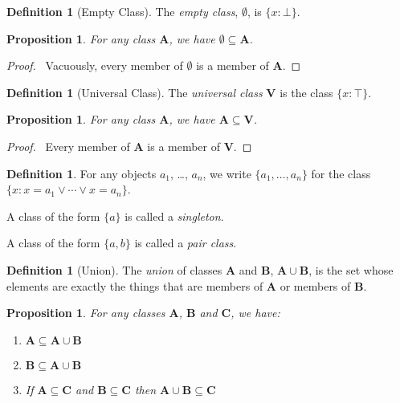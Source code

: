 \documentclass{article}
\let\qed\relax
\newtheorem{proposition}[axiom]{Proposition}
\theoremstyle{definition}
\newtheorem{definition}[axiom]{Definition}
\begin{document}
    \begin{definition}[Empty Class]
        The \emph{empty class}, $\emptyset$, is $\{ x : \bot \}$.
    \end{definition}

    \begin{proposition}
        For any class $\mathbf{A}$, we have $\emptyset \subseteq \mathbf{A}$.
    \end{proposition}

    \begin{proof}
        \pf\ Vacuously, every member of $\emptyset$ is a member of $\mathbf{A}$.
    \end{proof}

    \begin{definition}[Universal Class]
        The \emph{universal class} $\mathbf{V}$ is the class $\{ x : \top \}$.
    \end{definition}

    \begin{proposition}
        For any class $\mathbf{A}$, we have $\mathbf{A} \subseteq \mathbf{V}$.
    \end{proposition}

    \begin{proof}
        \pf\ Every member of $\mathbf{A}$ is a member of $\mathbf{V}$. \qed
    \end{proof}

    \begin{definition}
        For any objects $a_1$, \ldots, $a_n$, we write $\{ a_1, \ldots, a_n \}$ for the class
        $\{ x : x = a_1 \vee \cdots \vee x = a_n \}$.

        A class of the form $\{a\}$ is called a \emph{singleton}.

        A class of the form $\{a,b\}$ is called a \emph{pair class}.
    \end{definition}

    \begin{definition}[Union]
        The \emph{union} of classes $\mathbf{A}$ and $\mathbf{B}$, 
        $\mathbf{A} \cup \mathbf{B}$, is the set whose elements are exactly the things
        that are members of $\mathbf{A}$ or members of $\mathbf{B}$.
    \end{definition}

    \begin{proposition}
        For any classes $\mathbf{A}$, $\mathbf{B}$ and $\mathbf{C}$, we have:
        \begin{enumerate}
            \item $\mathbf{A} \subseteq \mathbf{A} \cup \mathbf{B}$
            \item $\mathbf{B} \subseteq \mathbf{A} \cup \mathbf{B}$
            \item If $\mathbf{A} \subseteq \mathbf{C}$ and $\mathbf{B} \subseteq \mathbf{C}$
            then $\mathbf{A} \cup \mathbf{B} \subseteq \mathbf{C}$
        \end{enumerate}
    \end{proposition}
\end{document}
